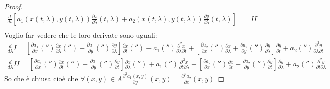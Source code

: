 \documentclass[a4paper, oneside]{article}
\begin{document}
\begin{proof}
\begin{gather*}
        \frac{d}{d t}\left[a_1(x(t, \lambda),y(t, \lambda))\frac{\partial x}{\partial \lambda}(t, \lambda) + a_2(x(t, \lambda),y(t, \lambda))\frac{\partial y}{\partial \lambda}(t, \lambda)\right] \qquad \boxed{II}\\
    \end{gather*}
    Voglio far vedere che le loro derivate sono uguali:
    \begin{gather*}
        \frac{d}{d\lambda} \boxed{I} = \left[ \frac{\partial a_1}{\partial x}( '' ) \frac{\partial x}{\partial \lambda}( '' )+ \frac{\partial a_1}{\partial y}( '' )\frac{\partial y}{\partial \lambda}\right]\frac{\partial x}{\partial t}( '' ) + a_1( '' ) \frac{\partial^2 x}{\partial \lambda \partial t} + \left[ \frac{\partial a_2}{\partial x}( '' )\frac{\partial x}{\partial \lambda} + \frac{\partial a_2}{\partial y}( '' )\frac{\partial y}{\partial \lambda} \right]\frac{\partial y}{\partial t} + a_2( '' )\frac{\partial^2 y}{\partial \lambda \partial t}\\
        \frac{d}{d \lambda} \boxed{II} = \left[ \frac{\partial a_1}{\partial x}( '' ) \frac{\partial x}{\partial t}( '' )+ \frac{\partial a_1}{\partial y}( '' )\frac{\partial y}{\partial t}\right]\frac{\partial x}{\partial \lambda}( '' ) + a_1( '' ) \frac{\partial^2 x}{\partial t \partial \lambda} + \left[ \frac{\partial a_2}{\partial x}( '' )\frac{\partial x}{\partial t} + \frac{\partial a_2}{\partial y}( '' )\frac{\partial y}{\partial t} \right]\frac{\partial y}{\partial \lambda} + a_2( '' )\frac{\partial^2 y}{\partial t \partial \lambda}
    \end{gather*}
    So che è chiusa cioè che $\forall(x,y) \in A \frac{\partial^2 a_1 (x,y)}{\partial y}(x,y) = \frac{\partial^2 a_2}{\partial x} (x,y)$
\end{proof}

\newpage
\end{document}
